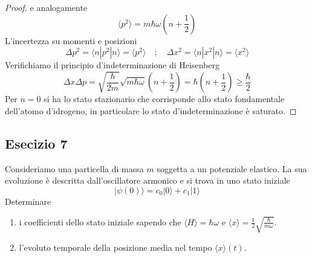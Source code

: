 \begin{proof}
e analogamente
\begin{equation*}
	\langle p^2 \rangle = m \hbar \omega \left( n + \frac{1}{2}\right)
\end{equation*}
L'incertezza su momenti e posizioni
\begin{equation*}
	\Delta p^2 = \langle n| p^2|n \rangle = \langle p^2\rangle \quad ; \quad \Delta x^2 = \langle n |x^2|n\rangle = \langle x^2\rangle  
\end{equation*}
Verifichiamo il principio d'indeterminazione  di Heisenberg 
\begin{equation*}
	\Delta x \Delta p = \sqrt{\frac{\hbar}{2m}} \sqrt{m\hbar \omega}\left( n + \frac{1}{2}\right) = \hbar \left(n + \frac{1}{2}\right) \geq \frac{\hbar}{2}
\end{equation*}
Per $n=0$ si ha lo stato stazionario che corrisponde allo stato fondamentale dell'atomo d'idrogeno, in particolare lo stato d'indeterminazione \`e saturato.

\end{proof}

\subsection{Esecizio 7}

Consideriamo una particella di massa $m$ soggetta a un potenziale elastico. La sua evoluzione \`e descritta dall'oscillatore armonico e si trova in uno stato iniziale 
\begin{equation*}
	|\psi(0) \rangle = c_0|0\rangle + c_1|1\rangle 
\end{equation*}
Determinare 
\begin{enumerate}
	\item i coefficienti dello stato iniziale sapendo che $\langle H \rangle = \hbar \omega$ e $\langle x \rangle = \frac{1}{2} \sqrt{\frac{\hbar}{m \omega}}$.
	\item l'evoluto temporale della posizione media nel tempo $\langle x \rangle (t)$.
\end{enumerate}

